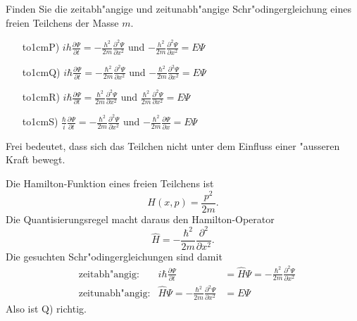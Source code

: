 Finden Sie die zeitabh"angige und zeitunabh"angige Schr"odingergleichung
eines freien Teilchens der Masse $m$.
\begin{itemize}
\item[\hbox to1cm{P)\hfill}]
$i h\frac{\partial\Psi}{\partial t}
=
-\frac{h^2}{2m}\frac{\partial^2\Psi}{\partial x^2}$
und
$-\frac{h^2}{2m}\frac{\partial^2\Psi}{\partial x^2}
=E\Psi$
\item[\hbox to1cm{Q)\hfill}]
$i\hbar\frac{\partial\Psi}{\partial t}
=
-\frac{\hbar^2}{2m}\frac{\partial^2\Psi}{\partial x^2}$
und
$-\frac{\hbar^2}{2m}\frac{\partial^2\Psi}{\partial x^2}
=E\Psi$
\item[\hbox to1cm{R)\hfill}]
$i\hbar\frac{\partial\Psi}{\partial t}
=
\frac{\hbar^2}{2m}\frac{\partial^2\Psi}{\partial x^2}$
und
$\frac{\hbar^2}{2m}\frac{\partial^2\Psi}{\partial x^2}
=E\Psi$
\item[\hbox to1cm{S)\hfill}]
$\frac{\hbar}{i}\frac{\partial\Psi}{\partial t}
=
-\frac{\hbar^2}{2m}\frac{\partial^2\Psi}{\partial x^2}$
und
$-\frac{\hbar^2}{2m}\frac{\partial\Psi}{\partial x}
=E\Psi$
\end{itemize}

\begin{hinweis}
Frei bedeutet, dass sich das Teilchen nicht unter dem Einfluss einer
"ausseren Kraft bewegt.
\end{hinweis}

\begin{loesung}
Die Hamilton-Funktion eines freien Teilchens ist
\[
H(x,p)=\frac{p^2}{2m}.
\]
Die Quantisierungsregel macht daraus den Hamilton-Operator
\[
\hat H=-\frac{\hbar^2}{2m}\frac{\partial^2}{\partial x^2}.
\]
Die gesuchten Schr"odingergleichungen sind damit
\begin{align*}
&\text{zeitabh"angig:}&
i\hbar \frac{\partial \Psi}{\partial t}&=\hat H\Psi=-\frac{\hbar^2}{2m}\frac{\partial^2\Psi}{\partial x^2}\\
&\text{zeitunabh"angig:}&
\hat H\Psi=-\frac{\hbar^2}{2m}\frac{\partial^2\Psi}{\partial x^2}&=E\Psi
\end{align*}
Also ist Q) richtig.
\end{loesung}

